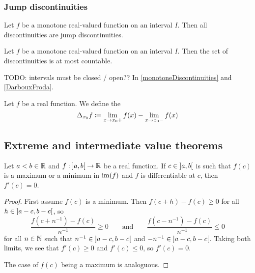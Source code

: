 \subsubsection{Jump discontinuities}
\begin{proposition} \label{monotoneDiscontinuities}
Let $f$ be a monotone real-valued function on an interval $I$. Then all discontinuities are jump discontinuities.
\end{proposition}
\begin{theorem} \label{DarbouxFroda}
Let $f$ be a monotone real-valued function on an interval $I$. Then the set of discontinuities is at most countable.
\end{theorem}

TODO: intervals must be closed / open?? In \ref{monotoneDiscontinuities} and \ref{DarbouxFroda}.


\begin{definition}
Let $f$ be a real function. We define the 
\[ \Delta_{x_0}f \coloneqq \lim_{x\to x_0+} f(x) - \lim_{x\to x_0-} f(x) \]
\end{definition}

\subsection{Extreme and intermediate value theorems}
\begin{theorem} \label{fermatsTheorem}
Let $a<b\in \mathbb{R}$ and $f: \interval[o]{a,b}\to \R$ be a real function. If $c\in \interval[o]{a,b}$ is such that $f(c)$ is a maximum or a minimum in $\operatorname{im}(f)$ and $f$ is differentiable at $c$, then $f'(c) = 0$.
\end{theorem}
\begin{proof}
First assume $f(c)$ is a minimum. Then $f(c+h)-f(c) \geq 0$ for all $h\in \interval[o]{a-c, b-c}$, so
\[ \frac{f(c+n^{-1})-f(c)}{n^{-1}} \geq 0 \qquad\text{and}\qquad \frac{f(c-n^{-1})-f(c)}{-n^{-1}} \leq 0 \]
for all $n\in \mathbb{N}$ such that $n^{-1}\in \interval[o]{a-c, b-c}$ and $-n^{-1}\in \interval[o]{a-c, b-c}$. Taking both limits, we see that $f'(c) \geq 0$ and $f'(c) \leq 0$, so $f'(c) = 0$.

The case of $f(c)$ being a maximum is analoguous.
\end{proof}

